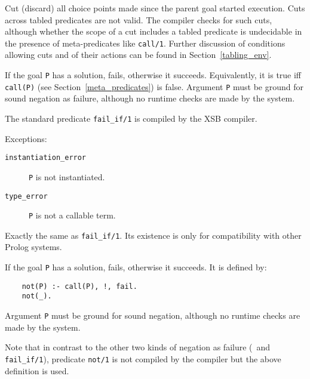 \begin{description}
\ouritem{\cut}\index{{\cut}} 
    Cut (discard) all choice points made since the parent goal
    started execution.
    Cuts across tabled predicates are not valid.  The compiler checks for
    such cuts, although whether the scope of a cut includes a tabled 
    predicate is undecidable in the presence of meta-predicates like
    {\tt call/1}.
    Further discussion of conditions allowing cuts and of their actions 
    can be found in Section~\ref{tabling_env}.

    If the goal {\tt P} has a solution, fails, otherwise it succeeds.
    Equivalently, it is true iff {\tt call(P)} 
    (see Section~\ref{meta_predicates}) is false. Argument {\tt P} 
    must be ground for sound negation as failure, although no runtime 
    checks are made by the system.

    The standard predicate {\tt fail\_if/1} is compiled by the 
    XSB compiler.

    Exceptions:
    \begin{description}
    \item[{\tt instantiation\_error}]
	{\tt P} is not instantiated.
    \item[{\tt type\_error}]
	{\tt P} is not a callable term.
    \end{description}


\index{{\tt \not}}
    Exactly the same as {\tt fail\_if/1}.  Its existence is only 
    for compatibility with other Prolog systems.

    If the goal {\tt P} has a solution, fails, otherwise it succeeds.
    It is defined by:
    \begin{center}
    \begin{minipage}{2.40in}
    \begin{verbatim}
	not(P) :- call(P), !, fail.
	not(_).
    \end{verbatim}
    \end{minipage}
    \end{center}

    Argument {\tt P} must be ground for sound negation, although no 
    runtime checks are made by the system.

    Note that in contrast to the other two kinds of negation as failure
    (\not\ and {\tt fail\_if/1}), predicate {\tt not/1} is not compiled
    by the compiler but the above definition is used.


\end{description}

